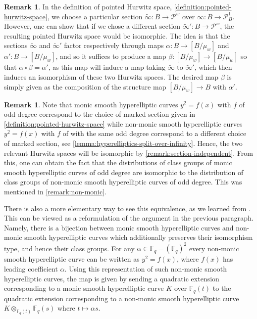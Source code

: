 \documentclass[12 pt]{amsart}
\theoremstyle{plain}
\theoremstyle{definition}
\newtheorem{remark}[theorem]{Remark}
\theoremstyle{remark}
\numberwithin{equation}{section}
\begin{document}
\begin{remark}
	\label{remark:section-independent}
	In the definition of pointed Hurwitz space,
	\autoref{definition:pointed-hurwitz-space}, we choose a particular section
	$\widetilde{\infty} :B \to \mathscr P^w$ over $\infty: B \to \mathscr
	P^1_B$. However, one can show
	that if we chose a different section $\widetilde{\infty}' :B \to \mathscr
	P^w$, the resulting pointed Hurwitz space would be isomorphic.
	The idea is that the sections $\widetilde{\infty}$ and
	$\widetilde{\infty}'$ factor respectively through maps $\alpha: B \to [B/
	\mu_w]$ and $\alpha' : B \to [B/\mu_w]$, and so it suffices to produce a
	map $\beta: [B/\mu_w] \to [B/\mu_w]$ so that $\alpha \circ \beta =
	\alpha'$, as this map will induce a map taking $\widetilde{\infty}$ to
	$\widetilde{\infty}'$, which then induces an isomorphism of these two
	Hurwitz spaces.
	The desired map $\beta$ is simply given as the composition of the
	structure map $[B/\mu_w] \to B$ with $\alpha'$.
\end{remark}

\begin{remark}
	\label{remark:odd-degree-independence}
	Note that monic smooth hyperelliptic curves $y^2 = f(x)$ with $f$ of odd degree correspond to the choice of
	marked section given in \autoref{definition:pointed-hurwitz-space} while
	non-monic smooth hyperelliptic curves $y^2 = f(x)$ with $f$ of with the same odd degree
	correspond to a different choice of marked section, see
	\autoref{lemma:hyperelliptics-split-over-infinity}.
	Hence, the two relevant
	Hurwitz spaces will be isomorphic by
	\autoref{remark:section-independent}. From this, one can obtain 
	the fact that the distributions of class groups of monic smooth hyperelliptic
	curves of odd degree are isomorphic to the distribution of class groups of non-monic
	smooth
	hyperelliptic curves of odd degree. This was mentioned in
	\autoref{remark:non-monic}.

	There is also a more elementary way to see this equivalence,  as we learned from 
\cite[Corollary
6.5]{bostonW:non-abelian-cohen-lenstra-heuristics}.
This can be viewed as a reformulation of the argument in the previous paragraph.
Namely, there is a bijection between monic smooth hyperelliptic curves and
non-monic smooth
hyperelliptic curves which additionally preserves their isomorphism type, and
hence their class groups. 
For any $\alpha \in \mathbb F_q -(\mathbb F_q)^2$
every non-monic smooth hyperelliptic curve can be written as
$y^2 = f(x)$, where $f(x)$ has leading coefficient $\alpha$.
Using this representation of such non-monic smooth hyperelliptic curves, the map is given by 
sending a quadratic extension corresponding to a monic
smooth
hyperelliptic curve
$K$ over $\mathbb F_q(t)$ to the quadratic extension corresponding to a
non-monic smooth hyperelliptic curve $K
\otimes_{\mathbb F_q(t)} \mathbb F_q(s)$ where $t \mapsto \alpha s$.
\end{remark}
\end{document}
